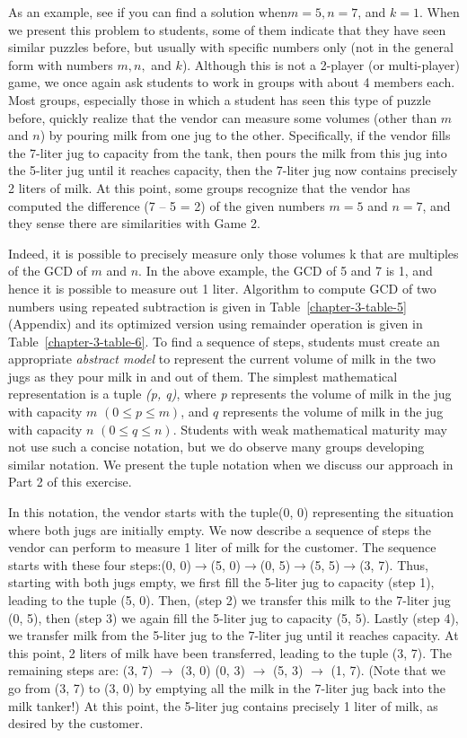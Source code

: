 \begin{multicols}{2}
As an example, see if you can find a solution when\break $m = 5, n = 7$, and $k = 1$. When we present this problem to students, some of them indicate that they have seen similar puzzles before, but usually with specific numbers only (not in the general form with numbers $m, n,$ and $k$). Although this is not a 2-player (or multi-player) game, we once again ask students to work in groups with about 4 members each. Most groups, especially those in which a student has seen this type of puzzle before, quickly realize that the vendor can measure some volumes (other than $m$ and $n$) by pouring milk from one jug to the other. Specifically, if the vendor fills the 7-liter jug to capacity from the tank, then pours the milk from this jug into the 5-liter jug until it reaches capacity, then the 7-liter jug now contains precisely 2 liters of milk. At this point, some groups recognize that the vendor has computed the difference (7 – 5 = 2) of the given numbers $m = 5$ and $n = 7$, and they sense there are similarities with Game 2.

Indeed, it is possible to precisely measure only those volumes k that are multiples of the GCD of $m$ and $n$. In the above example, the GCD of 5 and 7 is 1, and hence it is possible to measure out 1 liter. Algorithm to compute GCD of two numbers using repeated subtraction is given in Table~\ref{chapter-3-table-5} (Appendix) and its optimized version using remainder operation is given in Table~\ref{chapter-3-table-6}. To find a sequence of steps, students must create an appropriate \textit{abstract model} to represent the current volume of milk in the two jugs as they pour milk in and out of them. The simplest mathematical representation is a tuple \textit{(p, q)}, where \textit{p} represents the volume of milk in the jug with capacity $m$ $(0 \leq p \leq m)$, and $q$ represents the volume of milk in the jug with capacity $n$ $(0 \leq q \leq n)$. Students with weak mathematical maturity may not use such a concise notation, but we do observe many groups developing similar notation. We present the tuple notation when we discuss our approach in Part 2 of this exercise.

In this notation, the vendor starts with the tuple\break (0, 0) representing the situation where both jugs are initially empty. We now describe a sequence of steps the vendor can perform to measure 1 liter of milk for the customer. The sequence starts with these four steps:\break (0, 0)$\rightarrow$(5, 0)$\rightarrow$(0, 5)$\rightarrow$(5, 5)$\rightarrow$(3, 7). Thus, starting with both jugs empty, we first fill the 5-liter jug to capacity (step 1), leading to the tuple (5, 0). Then, (step 2) we transfer this milk to the 7-liter jug (0, 5), then (step 3) we again fill the 5-liter jug to capacity (5, 5). Lastly (step 4), we transfer milk from the 5-liter jug to the 7-liter jug until it reaches capacity. At this point, 2 liters of milk have been transferred, leading to the tuple (3, 7). The remaining steps are: (3, 7) $\rightarrow$ (3, 0)  (0, 3) $\rightarrow$ (5, 3) $\rightarrow$ (1, 7). (Note that we go from (3, 7) to (3, 0) by emptying all the milk in the 7-liter jug back into the milk tanker!) At this point, the 5-liter jug contains precisely 1 liter of milk, as desired by the customer.


\end{multicols}
